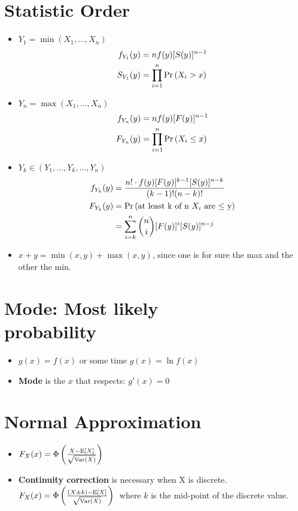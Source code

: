 \documentclass[10pt, french]{article}
\begin{document}
\begin{multicols*}{3}
\section*{Statistic Order}
\label{Appendix: Statistic Order}
\begin{itemize}[align=left,leftmargin=*]
    \item $Y_1 = \min(X_1, ... ,X_n)$
    \begin{align*}
        f_{Y_1}(y) &= nf(y)[S(y)]^{n-1} \\
        S_{Y_1}(y) &= \prod_{i=1}^n \Pr \left( X_i>x \right)
    \end{align*} 
    \item $Y_n = \max(X_1, ... ,X_n)$
    \begin{align*}
        f_{Y_n}(y) &= nf(y)[F(y)]^{n-1} \\
        F_{Y_n}(y) &= \prod_{i=1}^n \Pr \left( X_i\leq x \right)
    \end{align*}
    \item $Y_k \in (Y_1,...,Y_k,...,Y_n)$
    \begin{align*}
        f_{Y_k}(y) &= \frac{n!\cdot f(y)[F(y)]^{k-1}[S(y)]^{n-k}}{(k-1)!(n-k)!} \\
        F_{Y_k}(y) &= \Pr \left( \text{at least k of n $X_i$ are $\leq$ y} \right) \\
                   &= \sum_{i=k}^n \binom{n}{i} [F(y)]^i[S(y)]^{n-j}
    \end{align*}
    \item $x+y=\min(x,y)+\max(x,y)$, since one is for sure the max and the other the min.
\end{itemize}

\section*{Mode: Most likely \\ probability}
\begin{itemize}[align=left,leftmargin=*]
    \item $g(x) = f(x)$ or some time $g(x) = \ln f(x)$
    \item \textbf{Mode} is the $x$ that respects: $g'(x) = 0$
\end{itemize}

\section*{Normal Approximation}
\begin{itemize}[align=left,leftmargin=*]
    \item $F_X(x) = \Phi \left( \frac{X - \mathrm{E} {\left[ X \right]}}{\sqrt{\mathrm{Var} {\left( X \right)}}} \right)$
    \item \textbf{Continuity correction} is necessary when X is discrete. $F_X(x) = \Phi \left( \frac{(X \pm k) - \mathrm{E} {\left[ X \right]}}{\sqrt{\mathrm{Var} {\left( X \right)}}} \right)\:$ where $k$ is the mid-point of the discrete value.
\end{itemize}


\end{multicols*}
\end{document}
